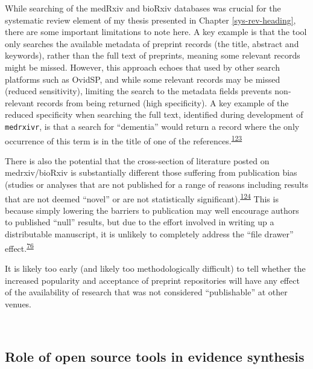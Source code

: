 \documentclass[a4paper, twoside]{templates/ociamthesis}
\begin{document}
While searching of the medRxiv and bioRxiv databases was crucial for the systematic review element of my thesis presented in Chapter \ref{sys-rev-heading}, there are some important limitations to note here. A key example is that the tool only searches the available metadata of preprint records (the title, abstract and keywords), rather than the full text of preprints, meaning some relevant records might be missed. However, this approach echoes that used by other search platforms such as OvidSP, and while some relevant records may be missed (reduced sensitivity), limiting the search to the metadata fields prevents non-relevant records from being returned (high specificity). A key example of the reduced specificity when searching the full text, identified during development of \texttt{medrxivr}, is that a search for ``dementia'' would return a record where the only occurrence of this term is in the title of one of the references.\textsuperscript{\protect\hyperlink{ref-bong2019}{123}}

There is also the potential that the cross-section of literature posted on medrxiv/bioRxiv is substantially different those suffering from publication bias (studies or analyses that are not published for a range of reasons including results that are not deemed ``novel'' or are not statistically significant).\textsuperscript{\protect\hyperlink{ref-song2010}{124}} This is because simply lowering the barriers to publication may well encourage authors to published ``null'' results, but due to the effort involved in writing up a distributable manuscript, it is unlikely to completely address the ``file drawer'' effect.\textsuperscript{\protect\hyperlink{ref-rosenthal1979}{76}}

It is likely too early (and likely too methodologically difficult) to tell whether the increased popularity and acceptance of preprint repositories will have any effect of the availability of research that was not considered ``publishable'' at other venues.

~

\hypertarget{role-of-open-source-tools-in-evidence-synthesis}{%
\subsection{Role of open source tools in evidence synthesis}\label{role-of-open-source-tools-in-evidence-synthesis}}
\end{document}
